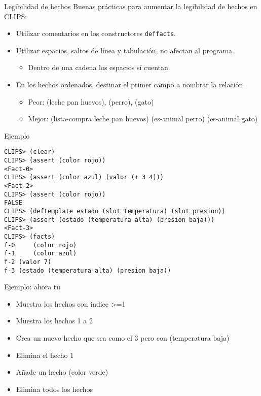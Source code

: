 \documentclass[usenames,dvipsnames,aspectratio=169]{beamer}
\begin{document}
\begin{frame}{Legibilidad de hechos}
	Buenas prácticas para aumentar la legibilidad de hechos en CLIPS:
	\begin{itemize}
		\item Utilizar comentarios en los constructores \texttt{deffacts}.
		\item Utilizar espacios, saltos de línea y tabulación, no afectan al programa.
		\begin{itemize}
			\item Dentro de una cadena los espacios sí cuentan.
		\end{itemize}
		\item En los hechos ordenados, destinar el primer campo a nombrar la relación.
		\begin{itemize}
			\item Peor: (leche pan huevos), (perro), (gato)
			\item Mejor: (lista-compra leche pan huevos) (es-animal perro) (es-animal gato)
		\end{itemize}
	\end{itemize}
\end{frame}

\begin{frame}[fragile]{Ejemplo}
\begin{verbatim}
CLIPS> (clear)
CLIPS> (assert (color rojo))
<Fact-0>
CLIPS> (assert (color azul) (valor (+ 3 4)))
<Fact-2>
CLIPS> (assert (color rojo))
FALSE
CLIPS> (deftemplate estado (slot temperatura) (slot presion))
CLIPS> (assert (estado (temperatura alta) (presion baja)))
<Fact-3>
CLIPS> (facts)
f-0     (color rojo)
f-1     (color azul)
f-2 (valor 7)
f-3 (estado (temperatura alta) (presion baja))
\end{verbatim}
\end{frame}

\begin{frame}{Ejemplo: ahora tú}
	\begin{itemize}
		\item Muestra los hechos con índice >=1
		\item Muestra los hechos 1 a 2
		\item Crea un nuevo hecho que sea como el 3 pero con (temperatura baja)
		\item Elimina el hecho 1
		\item Añade un hecho (color verde)
		\item Elimina todos los hechos
	\end{itemize}
\end{frame}

\begin{frame}
\titlepage
\end{frame}
\end{document}

